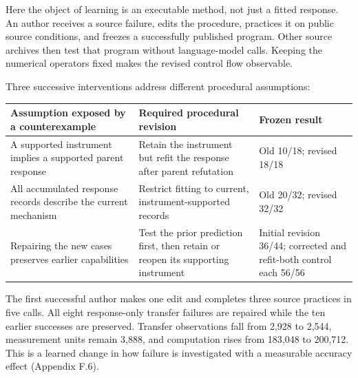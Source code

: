 \documentclass[11pt,a4paper]{article}
\begin{document}
Here the object of learning is an executable method, not just a fitted response.
An author receives a source failure, edits the procedure, practices it on public
source conditions, and freezes a successfully published program. Other source
archives then test that program without language-model calls. Keeping the
numerical operators fixed makes the revised control flow observable.


Three successive interventions address different procedural assumptions:


\begingroup\small\setlength{\tabcolsep}{4pt}
\renewcommand{\arraystretch}{1.18}
\par\addvspace{.7em}\noindent\begin{minipage}{\linewidth}
\begin{tabular}{@{}>{\raggedright\arraybackslash}p{}>{\raggedright\arraybackslash}p{}>{\raggedright\arraybackslash}p{}@{}}
\toprule
\textbf{Assumption exposed by a counterexample} & \textbf{Required procedural revision} & \textbf{Frozen result} \\
\midrule
A supported instrument implies a supported parent response & Retain the instrument but refit the response after parent refutation & Old 10/18; revised 18/18 \\
All accumulated response records describe the current mechanism & Restrict fitting to current, instrument-supported records & Old 20/32; revised 32/32 \\
Repairing the new cases preserves earlier capabilities & Test the prior prediction first, then retain or reopen its supporting instrument & Initial revision 36/44; corrected and refit-both control each 56/56 \\
\bottomrule
\end{tabular}
\end{minipage}\par\addvspace{.7em}
\endgroup

The first successful author makes one edit and completes three source practices
in five calls. All eight response-only transfer failures are repaired while the
ten earlier successes are preserved. Transfer observations fall from 2,928 to
2,544, measurement units remain 3,888, and computation rises from 183,048 to
200,712. This is a learned change in how failure is investigated with a measurable
accuracy effect (Appendix F.6).
\end{document}
